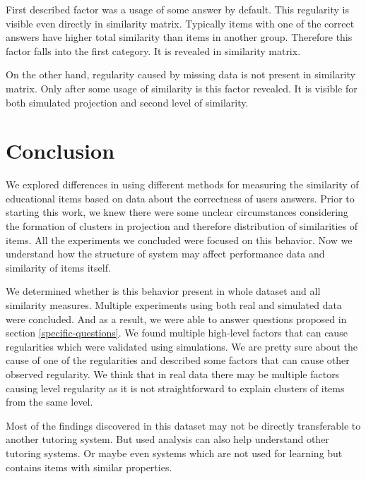 \documentclass[
  digital, %
  table,   %
  nolof,     %
  nolot,     %
  nocover,
  color,
  final, %
]{fithesis3}
\begin{document}
First described factor was a usage of some answer by default. This regularity is visible even directly in similarity matrix. Typically items with one of the correct answers have higher total similarity than items in another group. Therefore this factor falls into the first category. It is revealed in similarity matrix.

On the other hand, regularity caused by missing data is not present in similarity matrix. Only after some usage of similarity is this factor revealed. It is visible for both simulated projection and second level of similarity.

\chapter{Conclusion}



We explored differences in using different methods for measuring the similarity of educational items based on data about the correctness of users answers. Prior to starting this work, we knew there were some unclear circumstances considering the formation of clusters in projection and therefore distribution of similarities of items. All the experiments we concluded were focused on this behavior. Now we understand how the structure of system may affect performance data and similarity of items itself.

We determined whether is this behavior present in whole dataset and all similarity measures. Multiple experiments using both real and simulated data were concluded. And as a result, we were able to answer questions proposed in section \ref{specific-questions}. We found multiple high-level factors that can cause regularities which were validated using simulations. We are pretty sure about the cause of one of the regularities and described some factors that can cause other observed regularity. We think that in real data there may be multiple factors causing level regularity as it is not straightforward to explain clusters of items from the same level.

Most of the findings discovered in this dataset may not be directly transferable to another tutoring system. But used analysis can also help understand other tutoring systems. Or maybe even systems which are not used for learning but contains items with similar properties.
\end{document}
